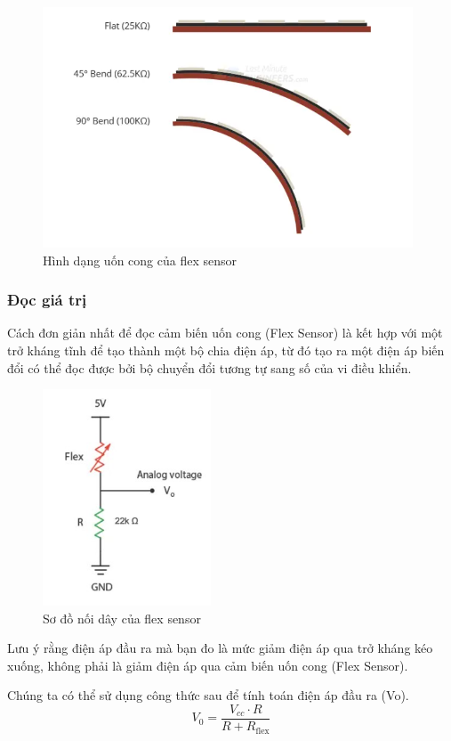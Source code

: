 \begin{figure}[H]
    \centering
    \includegraphics[width=11cm]{Images/Theoretical basis/flex sensor 1.png}
\caption{Hình dạng uốn cong của flex sensor}
\end{figure}

\subsubsection{Đọc giá trị}

\indent Cách đơn giản nhất để đọc cảm biến uốn cong (Flex Sensor) là kết hợp với một trở kháng tĩnh để tạo thành một bộ chia điện áp, từ đó tạo ra một điện áp biến đổi có thể đọc được bởi bộ chuyển đổi tương tự sang số của vi điều khiển.

\begin{figure}[H]
    \centering
    \includegraphics[width=5cm]{Images/Theoretical basis/flex sensor 2.jpg}
\caption{Sơ đồ nối dây của flex sensor}
\end{figure}

\indent Lưu ý rằng điện áp đầu ra mà bạn đo là mức giảm điện áp qua trở kháng kéo xuống, không phải là giảm điện áp qua cảm biến uốn cong (Flex Sensor).

\indent Chúng ta có thể sử dụng công thức sau để tính toán điện áp đầu ra (Vo).
\[ V_0 = \frac{V_{cc} \cdot R}{R + R_{\text{flex}}} \]


